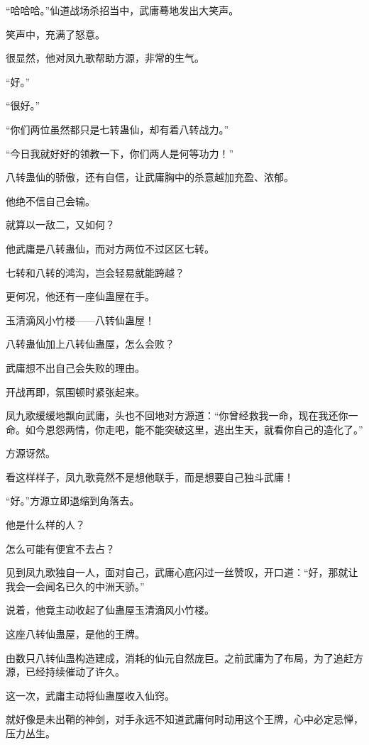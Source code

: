 
\begin{this_body}

“哈哈哈。”仙道战场杀招当中，武庸蓦地发出大笑声。

笑声中，充满了怒意。

很显然，他对凤九歌帮助方源，非常的生气。

“好。”

“很好。”

“你们两位虽然都只是七转蛊仙，却有着八转战力。”

“今日我就好好的领教一下，你们两人是何等功力！”

八转蛊仙的骄傲，还有自信，让武庸胸中的杀意越加充盈、浓郁。

他绝不信自己会输。

就算以一敌二，又如何？

他武庸是八转蛊仙，而对方两位不过区区七转。

七转和八转的鸿沟，岂会轻易就能跨越？

更何况，他还有一座仙蛊屋在手。

玉清滴风小竹楼——八转仙蛊屋！

八转蛊仙加上八转仙蛊屋，怎么会败？

武庸想不出自己会失败的理由。

开战再即，氛围顿时紧张起来。

凤九歌缓缓地飘向武庸，头也不回地对方源道：“你曾经救我一命，现在我还你一命。如今恩怨两情，你走吧，能不能突破这里，逃出生天，就看你自己的造化了。”

方源讶然。

看这样样子，凤九歌竟然不是想他联手，而是想要自己独斗武庸！

“好。”方源立即退缩到角落去。

他是什么样的人？

怎么可能有便宜不去占？

见到凤九歌独自一人，面对自己，武庸心底闪过一丝赞叹，开口道：“好，那就让我会一会闻名已久的中洲天骄。”

说着，他竟主动收起了仙蛊屋玉清滴风小竹楼。

这座八转仙蛊屋，是他的王牌。

由数只八转仙蛊构造建成，消耗的仙元自然庞巨。之前武庸为了布局，为了追赶方源，已经持续催动了许久。

这一次，武庸主动将仙蛊屋收入仙窍。

就好像是未出鞘的神剑，对手永远不知道武庸何时动用这个王牌，心中必定忌惮，压力丛生。


\end{this_body}
